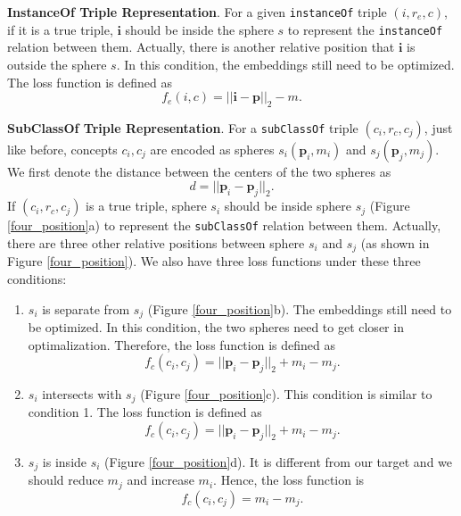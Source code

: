 \documentclass[11pt,a4paper]{article}
\begin{document}
  \textbf{InstanceOf Triple Representation}. For a given \texttt{instanceOf} triple $(i, r_e, c)$, 
   if it is a true triple, $\mathbf{i}$ should be inside the sphere $s$ to represent
  the \texttt{instanceOf} relation between them. 
  Actually, there is another relative position that $\mathbf{i}$ is outside the sphere $s$. In this condition, 
  the embeddings still need to be optimized. The loss function is defined as
  \begin{equation}
    f_e(i, c) = ||\mathbf{i} - \mathbf{p}||_2 - m.
  \end{equation}
  
  \textbf{SubClassOf Triple Representation}. For a \texttt{subClassOf} triple $(c_i, r_c, c_j)$, just like before, 
  concepts $c_i, c_j$ are encoded as spheres $s_i(\mathbf{p}_i, m_i)$ and $s_j(\mathbf{p}_j, m_j)$. 
  We first denote the distance between the centers of the two spheres as
  \begin{equation}
    d = ||\mathbf{p}_i - \mathbf{p}_j||_2.
  \end{equation}
  If $(c_i, r_c, c_j)$ is a true triple, sphere $s_i$ should be inside sphere $s_j$ (Figure \ref{four_position}a) to represent the \texttt{subClassOf} relation between them.
  Actually, there are three other relative positions between sphere $s_i$ and $s_j$ (as shown in Figure \ref{four_position}). We also have three loss functions under these 
  three conditions:
  \begin{enumerate}
    \item $s_i$ is separate from $s_j$ (Figure \ref{four_position}b). The embeddings still need to be optimized. In this condition, 
    the two spheres need to get closer in optimalization.
    Therefore, the loss function is defined as
    \begin{equation}
      f_c(c_i, c_j) = ||\mathbf{p}_i - \mathbf{p}_j||_2 + m_i - m_j.
    \end{equation}
    \item $s_i$ intersects with $s_j$ (Figure \ref{four_position}c). This condition is similar to condition 1. The loss function is defined as
    \begin{equation}
      f_c(c_i, c_j) = ||\mathbf{p}_i - \mathbf{p}_j||_2 + m_i - m_j.
    \end{equation}
    \item $s_j$ is inside $s_i$ (Figure \ref{four_position}d). It is different from our target and we should reduce $m_j$ and increase $m_i$. Hence, the loss function is
    \begin{equation}
      f_c(c_i, c_j) = m_i - m_j.
    \end{equation}
  \end{enumerate}
  
\end{document}
